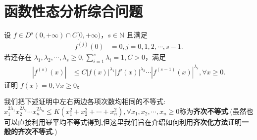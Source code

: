 \documentclass[../../main.tex]{subfiles}
\begin{document}
\section{函数性态分析综合问题}

\begin{proposition}\label{proposition:齐次化方法/关于导数乘积不等式问题}
设 $f \in D^s(0,+\infty) \cap C[0,+\infty)$，$s \in \mathbb{N}$ 且满足
\begin{align*}
f^{(j)}(0) &= 0, j = 0, 1, 2, \cdots, s - 1.
\end{align*}
若还存在 $\lambda_1, \lambda_2, \cdots, \lambda_s \geq 0, \sum_{i=1}^{s} \lambda_i = 1, C > 0$，满足
\begin{align}\label{example7.10-0.1}
\left| f^{(s)}(x) \right| &\leq C \left| f(x) \right|^{\lambda_1} \left| f'(x) \right|^{\lambda_2} \cdots \left| f^{(s-1)}(x) \right|^{\lambda_s}, \forall x \geq 0.
\end{align}
证明 $f(x) = 0, \forall x \geq 0$。
\end{proposition}
\begin{note}
我们把下述证明中左右两边各项次数均相同的不等式:$x_{1}^{2\lambda _1}x_{2}^{2\lambda _2}\cdots x_{n}^{2\lambda _n}\leqslant K\left( x_{1}^{2}+x_{2}^{2}+\cdots +x_{n}^{2} \right) ,\forall x_1,x_2,\cdots ,x_n\geqslant 0$称为\textbf{齐次不等式}.(虽然也可以直接利用幂平均不等式得到,但这里我们旨在介绍如何利用\textbf{齐次化方法}证明\textbf{一般的齐次不等式}.)
\end{note}
\end{document}
